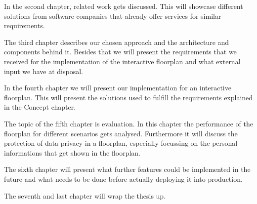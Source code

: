 In the second chapter, related work gets discussed. This will showcase different solutions from software companies that already offer services for similar requirements.

The third chapter describes our chosen approach and the architecture and components behind it. Besides that we will present the requirements that we received for the implementation of the interactive floorplan and what external input we have at disposal.

In the fourth chapter we will present our implementation for an interactive floorplan. This will present the solutions used to fulfill the requirements explained in the Concept chapter.

The topic of the fifth chapter is evaluation. In this chapter the performance of the floorplan for different scenarios gets analysed. Furthermore it will discuss the protection of data privacy in a floorplan, especially focussing on the personal informations that get shown in the floorplan.

The sixth chapter will present what further features could be implemented in the future and what needs to be done before actually deploying it into production. 

The seventh and last chapter will wrap the thesis up.

\clearpage
